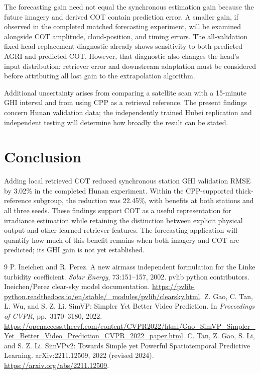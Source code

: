 \documentclass[11pt]{article}
\begin{document}
The forecasting gain need not equal the synchronous estimation gain because the future imagery and derived COT contain prediction error. A smaller gain, if observed in the completed matched forecasting experiment, will be examined alongside COT amplitude, cloud-position, and timing errors. The all-validation fixed-head replacement diagnostic already shows sensitivity to both predicted AGRI and predicted COT. However, that diagnostic also changes the head's input distribution; retriever error and downstream adaptation must be considered before attributing all lost gain to the extrapolation algorithm.

Additional uncertainty arises from comparing a satellite scan with a 15-minute GHI interval and from using CPP as a retrieval reference. The present findings concern Hunan validation data; the independently trained Hubei replication and independent testing will determine how broadly the result can be stated.

\section{Conclusion}
Adding local retrieved COT reduced synchronous station GHI validation RMSE by 3.02\% in the completed Hunan experiment. Within the CPP-supported thick-reference subgroup, the reduction was 22.45\%, with benefits at both stations and all three seeds. These findings support COT as a useful representation for irradiance estimation while retaining the distinction between explicit physical output and other learned retriever features. The forecasting application will quantify how much of this benefit remains when both imagery and COT are predicted; its GHI gain is not yet established.

\begin{thebibliography}{9}
P. Ineichen and R. Perez.
A new airmass independent formulation for the Linke turbidity coefficient.
\textit{Solar Energy}, 73:151--157, 2002.
pvlib python contributors.
Ineichen/Perez clear-sky model documentation.
\url{https://pvlib-python.readthedocs.io/en/stable/_modules/pvlib/clearsky.html}.
Z. Gao, C. Tan, L. Wu, and S. Z. Li.
SimVP: Simpler Yet Better Video Prediction.
In \textit{Proceedings of CVPR}, pp.~3170--3180, 2022.
\url{https://openaccess.thecvf.com/content/CVPR2022/html/Gao_SimVP_Simpler_Yet_Better_Video_Prediction_CVPR_2022_paper.html}.
C. Tan, Z. Gao, S. Li, and S. Z. Li.
SimVPv2: Towards Simple yet Powerful Spatiotemporal Predictive Learning.
arXiv:2211.12509, 2022 (revised 2024).
\url{https://arxiv.org/abs/2211.12509}.
\end{thebibliography}
\end{document}
